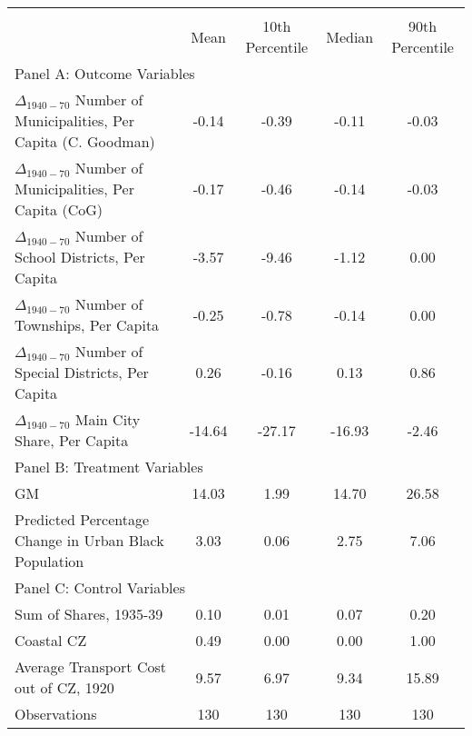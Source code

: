  \begin{tabular}{l*{4}{c}} \toprule
                &\multicolumn{4}{c}{}                   \\
                &     Mean&10th Percentile&   Median&90th Percentile\\
\cmidrule(lr){1-5}
\multicolumn{5}{l}{Panel A: Outcome Variables}\\
\cmidrule(lr){1-5}
$\Delta_{1940-70}$ Number of Municipalities, Per Capita (C. Goodman)&    -0.14&    -0.39&    -0.11&    -0.03\\
$\Delta_{1940-70}$ Number of Municipalities, Per Capita (CoG)&    -0.17&    -0.46&    -0.14&    -0.03\\
$\Delta_{1940-70}$ Number of School Districts, Per Capita&    -3.57&    -9.46&    -1.12&     0.00\\
$\Delta_{1940-70}$ Number of Townships, Per Capita&    -0.25&    -0.78&    -0.14&     0.00\\
$\Delta_{1940-70}$ Number of Special Districts, Per Capita&     0.26&    -0.16&     0.13&     0.86\\
$\Delta_{1940-70}$ Main City Share, Per Capita&   -14.64&   -27.17&   -16.93&    -2.46\\
\cmidrule(lr){1-5}
\multicolumn{5}{l}{Panel B: Treatment Variables}\\
\cmidrule(lr){1-5}
GM              &    14.03&     1.99&    14.70&    26.58\\
Predicted Percentage Change in Urban Black Population&     3.03&     0.06&     2.75&     7.06\\
\cmidrule(lr){1-5}
\multicolumn{5}{l}{Panel C: Control Variables}\\
\cmidrule(lr){1-5}
Sum of Shares, 1935-39&     0.10&     0.01&     0.07&     0.20\\
Coastal CZ      &     0.49&     0.00&     0.00&     1.00\\
Average Transport Cost out of CZ, 1920&     9.57&     6.97&     9.34&    15.89\\
\midrule Observations    &      130   &      130   &      130   &      130   \\    \bottomrule \end{tabular}
